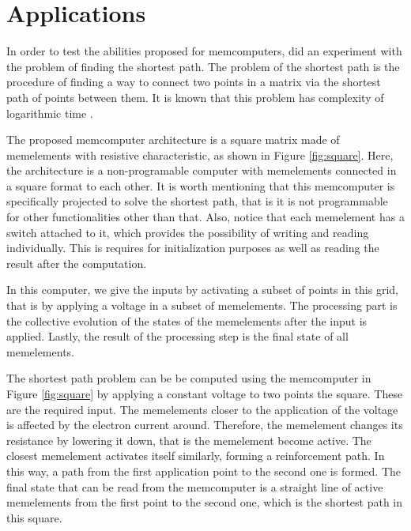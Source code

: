 \section{Applications}
\label{sec:app}

In order to test the abilities proposed for memcomputers, \citep{DiVentra:2012fh} did an experiment with the problem of finding the shortest path.
The problem of the shortest path is the procedure of finding a way to connect two points in a matrix via the shortest path of points between them.
It is known that this problem has complexity of logarithmic time \cite{shortestPath}.

The proposed memcomputer architecture is a square matrix made of memelements with resistive characteristic, as shown in Figure \ref{fig:square}.
Here, the architecture is a non-programable computer with memelements connected in a square format to each other.
It is worth mentioning that this memcomputer is specifically projected to solve the shortest path, that is it is not programmable for other functionalities other than that.
Also, notice that each memelement has a switch attached to it, which provides the possibility of writing and reading individually.
This is requires for initialization purposes as well as reading the result after the computation.

In this computer, we give the inputs by activating a subset of points in this grid, that is by applying a voltage in a subset of memelements.
The processing part is the collective evolution of the states of the memelements after the input is applied.
Lastly, the result of the processing step is the final state of all memelements.

The shortest path problem can be be computed using the memcomputer in Figure \ref{fig:square} by applying a constant voltage to two points the square.
These are the required input.
The memelements closer to the application of the voltage is affected by the electron current around.
Therefore, the memelement changes its resistance by lowering it down, that is the memelement become active.
The closest memelement activates itself similarly, forming a reinforcement path.
In this way, a path from the first application point to the second one is formed.
The final state that can be read from the memcomputer is a straight line of active memelements from the first point to the second one, which is the shortest path in this square.